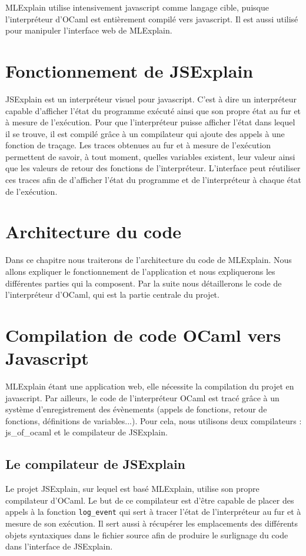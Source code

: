 \documentclass{easychair}
\begin{document}
MLExplain utilise intensivement javascript comme langage cible, puisque 
l'interpréteur d'OCaml est entièrement compilé vers javascript. Il est aussi 
utilisé pour manipuler l'interface web de MLExplain.



\section{Fonctionnement de JSExplain}
JSExplain est un interpréteur visuel pour javascript. C'est à dire un 
interpréteur capable d'afficher l'état du programme exécuté ainsi que son 
propre état au fur et à mesure de l'exécution. Pour que l'interpréteur puisse 
afficher l'état dans lequel il se trouve, il est compilé grâce à un compilateur 
qui ajoute des appels à une fonction de traçage. Les traces obtenues au fur et 
à mesure de l'exécution permettent de savoir, à tout moment, quelles variables 
existent, leur valeur ainsi que les valeurs de retour des fonctions de 
l'interpréteur. L'interface peut réutiliser ces traces afin de d'afficher 
l'état du programme et de l'interpréteur à chaque état de l'exécution.

\section{Architecture du code}
Dans ce chapitre nous traiterons de l'architecture du code de MLExplain. Nous 
allons expliquer le fonctionnement de l'application et nous expliquerons les 
différentes parties qui la composent. Par la suite nous détaillerons le code de 
l'interpréteur d'OCaml, qui est la partie centrale du projet.

\section{Compilation de code OCaml vers Javascript}
MLExplain étant une application web, elle nécessite la compilation du projet en 
javascript. Par ailleurs, le code de l'interpréteur OCaml est tracé grâce à un 
système d'enregistrement des évènements (appels de fonctions, retour de 
fonctions, définitions de variables...). Pour cela, nous utilisons deux 
compilateurs : js\_of\_ocaml et le compilateur de JSExplain.

\subsection{Le compilateur de JSExplain}
Le projet JSExplain, sur lequel est basé MLExplain, utilise son propre 
compilateur d'OCaml. Le but de ce compilateur est d'être capable de placer des 
appels à la fonction \verb|log_event| qui sert à tracer l'état de l'interpréteur 
au fur et à mesure de son exécution. Il sert aussi à récupérer les emplacements 
des différents objets syntaxiques dans le fichier source afin de produire le 
surlignage du code dans l'interface de JSExplain.
\end{document}

